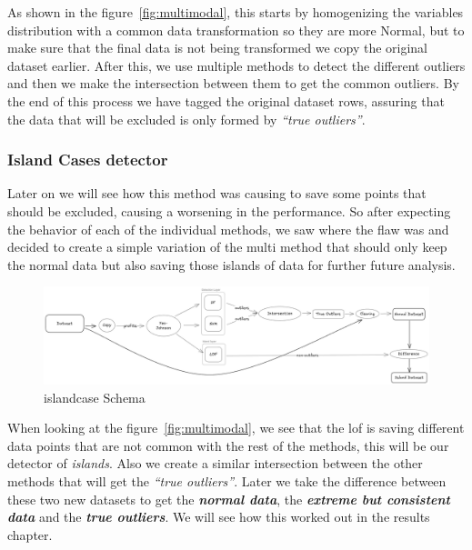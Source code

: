 \documentclass[11pt,english,a4paper,hidelinks]{book}
\begin{document}
\vspace{0.5cm}
\noindent As shown in the figure~\ref{fig:multimodal}, this starts by homogenizing the variables distribution with a common data transformation so they are more Normal, but to make sure that the final data is not being transformed we copy the original dataset earlier. After this, we use multiple methods to detect the different outliers and then we make the intersection between them to get the common outliers. By the end of this process we have tagged the original dataset rows, assuring that the data that will be excluded is only formed by \textit{``true outliers''}.

\subsubsection{Island Cases detector}

Later on we will see how this method was causing to save some points that should be excluded, causing a worsening in the performance. So after expecting the behavior of each of the individual methods, we saw where the flaw was and decided to create a simple variation of the \acrshort{multi} method that should only keep the normal data but also saving those islands of data for further future analysis.

\begin{figure}[H]
    \centering
    \includegraphics[width=1\textwidth]{images/code/outliers/Islands.png}
    \caption{\acrshort{islandcase} Schema}
    \label{fig:islands_of_outliers}
\end{figure}

\noindent When looking at the figure~\ref{fig:multimodal}, we see that the \acrshort{lof} is saving different data points that are not common with the rest of the methods, this will be our detector of \textit{islands}. Also we create a similar intersection between the other methods that will get the \textit{``true outliers''}. Later we take the difference between these two new datasets to get the \textbf{\textit{normal data}}, the \textbf{\textit{extreme but consistent data}} and the \textbf{\textit{true outliers}}. We will see how this worked out in the results chapter.
\end{document}
